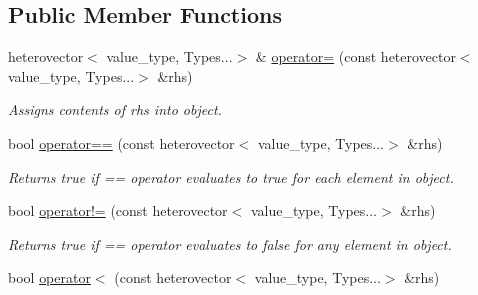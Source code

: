 \subsection*{Public Member Functions}
\begin{DoxyCompactItemize}
\item 
\hypertarget{classheterogeneous_1_1heterovector_3_01_t_00_01_types_8_8_8_4_ac99d9f0ba4371d873c73f01f937ebbe8}{}heterovector$<$ value\+\_\+type, Types...$>$ \& \hyperlink{classheterogeneous_1_1heterovector_3_01_t_00_01_types_8_8_8_4_ac99d9f0ba4371d873c73f01f937ebbe8}{operator=} (const heterovector$<$ value\+\_\+type, Types...$>$ \&rhs)\label{classheterogeneous_1_1heterovector_3_01_t_00_01_types_8_8_8_4_ac99d9f0ba4371d873c73f01f937ebbe8}

\begin{DoxyCompactList}\small\item\em Assigns contents of rhs into object. \end{DoxyCompactList}\item 
\hypertarget{classheterogeneous_1_1heterovector_3_01_t_00_01_types_8_8_8_4_a685270ed3cd01d0a8c65f42056f772d6}{}bool \hyperlink{classheterogeneous_1_1heterovector_3_01_t_00_01_types_8_8_8_4_a685270ed3cd01d0a8c65f42056f772d6}{operator==} (const heterovector$<$ value\+\_\+type, Types...$>$ \&rhs)\label{classheterogeneous_1_1heterovector_3_01_t_00_01_types_8_8_8_4_a685270ed3cd01d0a8c65f42056f772d6}

\begin{DoxyCompactList}\small\item\em Returns true if == operator evaluates to true for each element in object. \end{DoxyCompactList}\item 
\hypertarget{classheterogeneous_1_1heterovector_3_01_t_00_01_types_8_8_8_4_a26551ddb377bf4d7c0d8c1f3d4cb9eae}{}bool \hyperlink{classheterogeneous_1_1heterovector_3_01_t_00_01_types_8_8_8_4_a26551ddb377bf4d7c0d8c1f3d4cb9eae}{operator!=} (const heterovector$<$ value\+\_\+type, Types...$>$ \&rhs)\label{classheterogeneous_1_1heterovector_3_01_t_00_01_types_8_8_8_4_a26551ddb377bf4d7c0d8c1f3d4cb9eae}

\begin{DoxyCompactList}\small\item\em Returns true if == operator evaluates to false for any element in object. \end{DoxyCompactList}\item 
\hypertarget{classheterogeneous_1_1heterovector_3_01_t_00_01_types_8_8_8_4_a86ae429dcc32d5c6767fed384b942f20}{}bool \hyperlink{classheterogeneous_1_1heterovector_3_01_t_00_01_types_8_8_8_4_a86ae429dcc32d5c6767fed384b942f20}{operator$<$} (const heterovector$<$ value\+\_\+type, Types...$>$ \&rhs)\label{classheterogeneous_1_1heterovector_3_01_t_00_01_types_8_8_8_4_a86ae429dcc32d5c6767fed384b942f20}


\end{DoxyCompactItemize}
